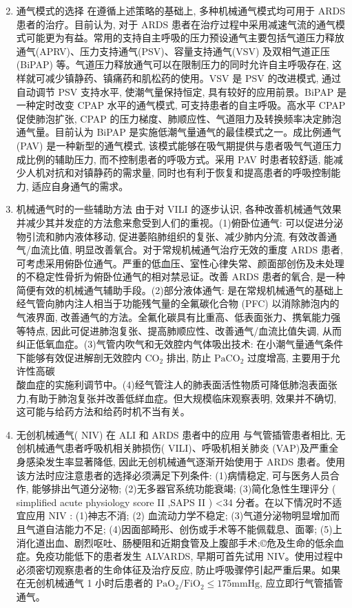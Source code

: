 \documentclass[10pt]{article}
\begin{document}
\begin{enumerate}
  \setcounter{enumi}{1}
  \item 通气模式的选择 在遵循上述策略的基础上, 多种机械通气模式均可用于 ARDS 患者的治疗。目前认为, 对于 ARDS 患者在治疗过程中采用减速气流的通气模式可能更为有益。常用的支持自主呼吸的压力预设通气主要包括气道压力释放通气(APRV)、压力支持通气(PSV)、容量支持通气(VSV) 及双相气道正压(BiPAP) 等。气道压力释放通气可以在限制压力的同时允许自主呼吸存在, 这样就可减少镇静药、镇痛药和肌松药的使用。VSV 是 PSV 的改进模式, 通过自动调节 PSV 支持水平, 使潮气量保持恒定, 具有较好的应用前景。BiPAP 是一种定时改变 CPAP 水平的通气模式, 可支持患者的自主呼吸。高水平 CPAP 促使肺泡扩张, CPAP 的压力梯度、肺顺应性、气道阻力及转换频率决定肺泡通气量。目前认为 BiPAP 是实施低潮气量通气的最佳模式之一。成比例通气(PAV) 是一种新型的通气模式, 该模式能够在吸气期提供与患者吸气气道压力成比例的辅助压力, 而不控制患者的呼吸方式。采用 PAV 时患者较舒适, 能减少人机对抗和对镇静药的需求量, 同时也有利于恢复和提高患者的呼吸控制能力, 适应自身通气的需求。

  \item 机械通气时的一些辅助方法 由于对 VILI 的逐步认识, 各种改善机械通气效果并减少其并发症的方法愈来愈受到人们的重视。(1)俯卧位通气: 可以促进分泌物引流和肺内液体移动, 促进萎陷肺组织的复张、减少肺内分流, 有效改善通气/血流比值, 明显改善氧合。对于常规机械通气治疗无效的重度 ARDS 患者,可考虑采用俯卧位通气。严重的低血压、室性心律失常、颜面部创伤及未处理的不稳定性骨折为俯卧位通气的相对禁忌证。改善 ARDS 患者的氧合, 是一种简便有效的机械通气辅助手段。(2)部分液体通气: 是在常规机械通气的基础上经气管向肺内注人相当于功能残气量的全氟碳化合物 (PFC) 以消除肺泡内的气液界面, 改善通气的方法。全氟化碳具有比重高、低表面张力、携氧能力强等特点, 因此可促进肺泡复张、提高肺顺应性、改善通气/血流比值失调, 从而纠正低氧血症。(3)气管内吹气和无效腔内气体吸出技术: 在小潮气量通气条件下能够有效促进解剖无效腔内 $\mathrm{CO}_{2}$ 排出, 防止 $\mathrm{PaCO}_{2}$ 过度增高, 主要用于允许性高碳\\
酸血症的实施利调节中。(4)经气管注人的肺表面活性物质可降低肺泡表面张力,有助于肺泡复张并改善低絴血症。但大规模临床观察表明, 效果并不确切, 这可能与给药方法和给药时机不当有关。

  \item 无创机械通气( NIV) 在 ALI 和 ARDS 患者中的应用 与气管插管患者相比, 无创机械通气患者呼吸机相关肺损伤( VILI)、呼吸机相关肺炎 (VAP)及严重全身感染发生率显著降低, 因此无创机械通气逐渐开始使用于 ARDS 患者。使用该方法时应注意患者的选择必须满足下列条件: (1)病情稳定, 可与医务人员合作, 能够排出气道分泌物; (2)无多器官系统功能衰竭; (3)简化急性生理评分 ( simplified acute physiology score II ,SAPS II ) <34 分者。在以下情况时不适宜应用 NIV : (1)神志不消; (2) 血流动力学不稳定; (3)气道分泌物明显增加而且气道自洁能力不足; (4)因面部畸形、创伤或手术等不能佩载息、面睪; (5)上消化道出血、剧烈呕吐、肠梗阻和近期食管及上腹部手术;©危及生命的低余血症。免疫功能低下的患者发生 ALVARDS, 早期可首先试用 NIV。使用过程中必须密切观察患者的生命体征及治疗反应, 防止呼吸骤停引起严重后果。如果在无创机械通气 1 小时后患者的 $\mathrm{PaO}_{2} / \mathrm{FiO}_{2} \leqslant 175 \mathrm{mmHg}$, 应立即行气管插管通气。


\end{enumerate}
\end{document}
